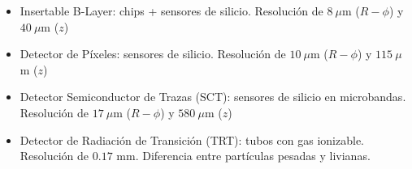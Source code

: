 \documentclass[10pt, compress,spanish]{beamer}
\begin{document}
\begin{frame}[fragile]
\begin{itemize}

  \item Insertable B-Layer: chips + sensores de silicio. Resolución de $8\:\mu$m ($R-\phi$) y $40\:\mu$m ($z$)

  \item Detector de Píxeles: sensores de silicio. Resolución de $10\:\mu$m ($R-\phi$) y $115\:\mu$m ($z$)

  \item Detector Semiconductor de Trazas (SCT): sensores de silicio en microbandas. Resolución de $17\:\mu$m ($R-\phi$) y $580\:\mu$m ($z$)

  \item Detector de Radiación de Transición (TRT): tubos con gas ionizable. Resolución de $0.17$ mm. Diferencia entre partículas pesadas y livianas.

\end{itemize}



\end{frame}



\end{document}

